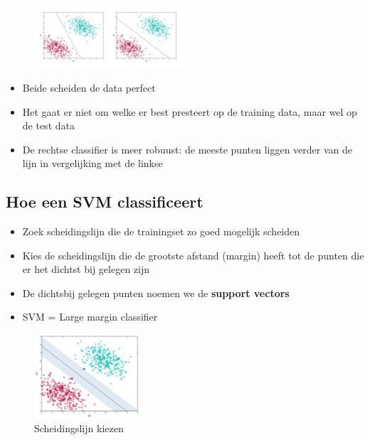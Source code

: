 \documentclass{article}
\begin{document}
\begin{figure}[H]
    \centering
    \includegraphics[width=0.5\textwidth]{svm-classifiers.png}
    \caption{}
\end{figure}

\begin{itemize}
    \item Beide scheiden de data perfect
    \item Het gaat er niet om welke er best presteert op de training data, maar wel op de test data
    \item De rechtse classifier is meer robuust: de meeste punten liggen verder van de lijn in vergelijking met de linkse
\end{itemize}

\subsection{Hoe een SVM classificeert}

\begin{itemize}
    \item Zoek scheidingslijn die de trainingset zo goed mogelijk scheiden
    \item Kies de scheidingslijn die de grootste afstand (margin) heeft tot de punten die er het dichtst bij gelegen zijn
    \item De dichtsbij gelegen punten noemen we de \textbf{support vectors}
    \item SVM = Large margin classifier
\end{itemize}

\begin{figure}[H]
    \centering
    \includegraphics[width=0.35\textwidth]{svm-hoe.png}
    \caption{Scheidingslijn kiezen}
\end{figure}
\end{document}
